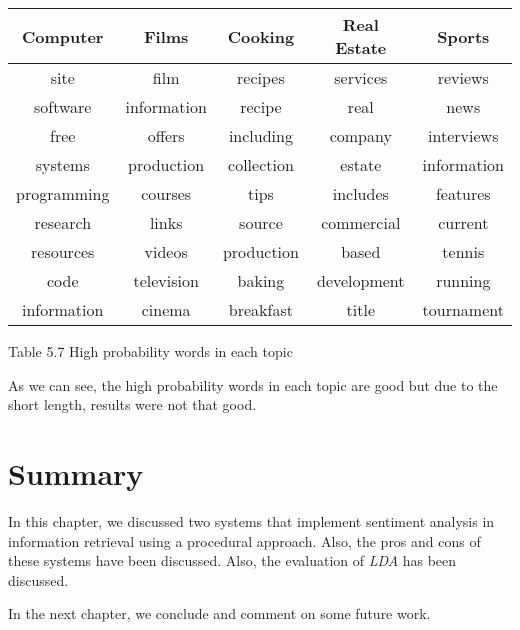 \begin{center}
\begin{tabular}{ |c|c|c|c|c| }
  \hline \hline
  Computer & Films & Cooking & Real Estate & Sports \\ \hline \hline
  site & film &	recipes & services & reviews \\ \hline
  software & information & recipe & real & news \\ \hline
  free & offers & including & company &	interviews\\ \hline
  systems & production & collection & estate & information \\ \hline
  programming & courses & tips & includes & features \\ \hline
  research & links & source & commercial & current \\ \hline
  resources & videos & production & based & tennis \\ \hline
  code & television & baking & development & running \\ \hline
  information &	cinema & breakfast & title & tournament \\ \hline
\end{tabular}
\end{center}
\begin{center}
 Table 5.7 High probability words in each topic 
\end{center}

As we can see, the high probability words in each topic are good but due to the short length, results were not that good. 

\section*{Summary}
In this chapter, we discussed two systems that implement sentiment analysis in information retrieval using a procedural approach. Also,
the pros and cons of these systems have been discussed. Also, the evaluation of \textit{LDA} has been discussed.

In the next chapter, we conclude and comment on some future work.

\clearpage